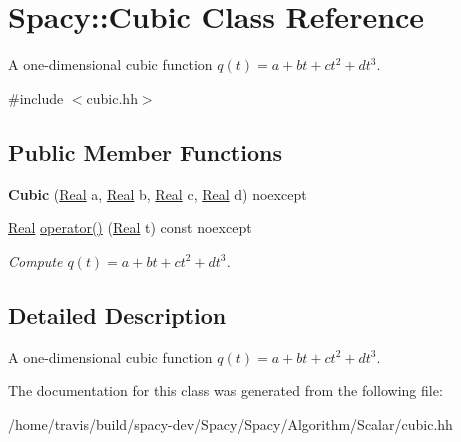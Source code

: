 \hypertarget{classSpacy_1_1Cubic}{\section{\-Spacy\-:\-:\-Cubic \-Class \-Reference}
\label{classSpacy_1_1Cubic}
}


\-A one-\/dimensional cubic function $q(t) = a + bt + ct^2 + dt^3$.  




{\ttfamily \#include $<$cubic.\-hh$>$}

\subsection*{\-Public \-Member \-Functions}
\begin{DoxyCompactItemize}
\item 
\hypertarget{classSpacy_1_1Cubic_aa0893e2540b9f5ac4b85e168c1f7d6d4}{{\bfseries \-Cubic} (\hyperlink{classSpacy_1_1Real}{\-Real} a, \hyperlink{classSpacy_1_1Real}{\-Real} b, \hyperlink{classSpacy_1_1Real}{\-Real} c, \hyperlink{classSpacy_1_1Real}{\-Real} d) noexcept}\label{classSpacy_1_1Cubic_aa0893e2540b9f5ac4b85e168c1f7d6d4}

\item 
\hypertarget{classSpacy_1_1Cubic_af2c7cb43b2d55bad525ade5caafe898e}{\hyperlink{classSpacy_1_1Real}{\-Real} \hyperlink{classSpacy_1_1Cubic_af2c7cb43b2d55bad525ade5caafe898e}{operator()} (\hyperlink{classSpacy_1_1Real}{\-Real} t) const noexcept}\label{classSpacy_1_1Cubic_af2c7cb43b2d55bad525ade5caafe898e}

\begin{DoxyCompactList}\small\item\em \-Compute $q(t) = a + bt + ct^2 + dt^3 $. \end{DoxyCompactList}\end{DoxyCompactItemize}


\subsection{\-Detailed \-Description}
\-A one-\/dimensional cubic function $q(t) = a + bt + ct^2 + dt^3$. 

\-The documentation for this class was generated from the following file\-:\begin{DoxyCompactItemize}
\item 
/home/travis/build/spacy-\/dev/\-Spacy/\-Spacy/\-Algorithm/\-Scalar/cubic.\-hh\end{DoxyCompactItemize}
